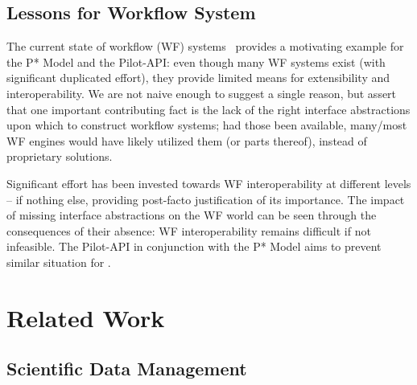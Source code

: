 \documentclass{sig-alternate}
\begin{document}
\subsection{Lessons for Workflow System}

The current state of workflow (WF) systems~\cite{nsf-workflow,1196459}
provides a motivating example for the P* Model and the Pilot-API: even
though many WF systems exist (with significant duplicated effort),
they provide limited means for extensibility and interoperability.  We
are not naive enough to suggest a single reason, but assert that one
important contributing fact is the lack of the right interface
abstractions upon which to construct workflow systems; had those been
available, many/most WF engines would have likely utilized them (or
parts thereof), instead of proprietary solutions.


Significant effort has been invested towards WF interoperability at
different levels -- if nothing else, providing post-facto
justification of its importance. The impact of missing interface
abstractions on the WF world can be seen through the consequences of
their absence: WF interoperability remains difficult if not
infeasible. The Pilot-API in conjunction with the P* Model aims to
prevent similar situation for \pilotjobs.




\section{Related Work}


\subsection{Scientific Data Management}
\end{document}
